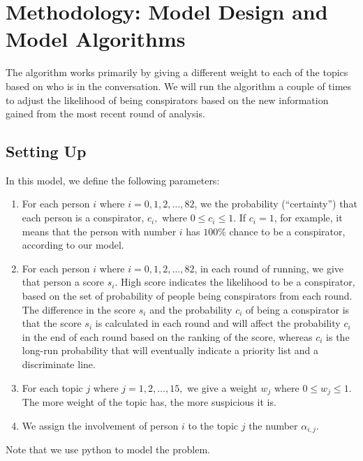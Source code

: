 \documentclass{icmmcm}
\begin{document}
\section{Methodology: Model Design and Model Algorithms}

The algorithm works primarily by giving a different weight to each of the 
topics based on who is in the conversation. We will run the algorithm
a couple of times to adjust the likelihood of being conspirators
based on the new information gained from the most 
recent round of analysis.

\subsection{Setting Up}
In this model, we define the following parameters:
\begin{enumerate}
\item  For each person $i$ where $i=0,1,2,\ldots, 82$, 
we the probability (``certainty'')
that each person is a conspirator, $c_i,$
where $0\leq c_i \leq 1.$ 
If $c_i=1$, for example, it means that the person
with number $i$ has $100\%$ chance to be
a conspirator, according to our model. 

\item  For each person $i$ where $i=0,1,2,\ldots, 82$, in each round of running,
we give that person a score $s_i$. High score indicates
the likelihood to be a conspirator, based on the set
of probability of people being conspirators from each round.
The difference in the score $s_i$ and the probability $c_i$ of
being a conspirator is that the score $s_i$ is calculated in each round
and will affect the probability $c_i$ in the end of each round
based on the ranking of the score, whereas $c_i$ is the long-run
probability that will eventually indicate a priority list and
a discriminate line.

\item For each topic $j$ where $j=1,2,\ldots,15,$
we give a weight $w_j$ where $0\leq w_j\leq 1.$
The more weight of the topic has, the more suspicious it is.

\item  We assign the involvement of person $i$ to the topic $j$ the number
$\alpha_{i,j}.$
\end{enumerate}

Note that we use python to model the problem.
\end{document}
